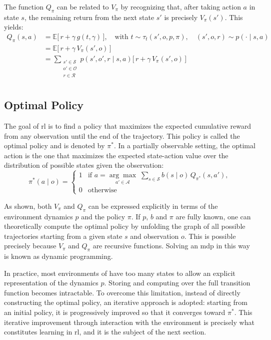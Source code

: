 The function \(Q_\pi\) can be related to \(V_\pi\) by recognizing that, after taking action \(a\) in state \(s\), the remaining return from the next state \(s'\) is precisely \(V_\pi(s')\).
This yields:
\[
\begin{aligned}
Q_\pi(s, a) 
&= \mathbb{E}\Big[\, r + \gamma \, g(t, \gamma) \,\Big], \quad \text{with } t \sim \tau_t(s', o, p, \pi), \quad (s', o, r) \sim p(\cdot \mid s, a) \\[4pt]
&= \mathbb{E}\Big[\, r + \gamma \, V_\pi(s', o) \,\Big] \\[4pt]
&= \sum_{\substack{s' \in \mathcal{S} \\ o' \in \mathcal{O} \\ r \in \mathcal{R}}} 
   p(s', o', r \mid s, a) \Big[\, r + \gamma \, V_\pi(s', o) \,\Big] \\[4pt]
\end{aligned}
\]

\subsection{Optimal Policy}
\label{subsec:optimal_policy}

The goal of \gls{rl} is to find a policy that maximizes the expected cumulative reward from any observation until the end of the trajectory.
This policy is called the optimal policy and is denoted by \(\pi^*\).
In a partially observable setting, the optimal action is the one that maximizes the expected state-action value over the distribution of possible states given the observation:
\[
\pi^*(a \mid o) =
\begin{cases}
1 & \text{if } a = \underset{a' \in \mathcal{A}}{\arg\max}\;
\sum_{s \in \mathcal{S}} b(s \mid o)\, Q_{\pi^*}(s, a'), \\[6pt]
0 & \text{otherwise}
\end{cases}
\]

As shown, both \(V_\pi\) and \(Q_\pi\) can be expressed explicitly in terms of the environment dynamics \(p\) and the policy \(\pi\).
If \(p\), \(b\)  and \(\pi\) are fully known, one can theoretically compute the optimal policy by unfolding the graph of all possible trajectories starting from a given state \(s\) and observation \(o\).  
This is possible precisely because \(V_\pi\) and \(Q_\pi\) are recursive functions.  
Solving an \gls{mdp} in this way is known as dynamic programming.

In practice, most environments of have too many states to allow an explicit representation of the dynamics \(p\).  
Storing and computing over the full transition function becomes intractable.
To overcome this limitation, instead of directly constructing the optimal policy, an iterative approach is adopted: starting from an initial policy, it is progressively improved so that it converges toward \(\pi^*\).
This iterative improvement through interaction with the environment is precisely what constitutes learning in \gls{rl}, and it is the subject of the next section.